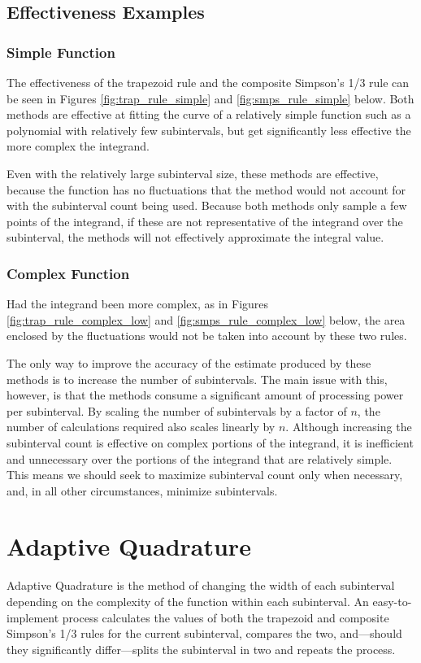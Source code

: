 \documentclass{paper}
\begin{document}
\subsection{Effectiveness Examples}
\subsubsection{Simple Function}

The effectiveness of the trapezoid rule and the composite Simpson's 1/3 rule can be seen in Figures \ref{fig:trap_rule_simple} and \ref{fig:smps_rule_simple} below.
Both methods are effective at fitting the curve of a relatively simple function such as a polynomial with relatively few subintervals, but get significantly less effective the more complex the integrand.




Even with the relatively large subinterval size, these methods are effective, because the function has no fluctuations that the method would not account for with the subinterval count being used.
Because both methods only sample a few points of the integrand, if these are not representative of the integrand over the subinterval, the methods will not effectively approximate the integral value.

\subsubsection{Complex Function}
Had the integrand been more complex, as in Figures \ref{fig:trap_rule_complex_low} and \ref{fig:smps_rule_complex_low} below, the area enclosed by the fluctuations would not be taken into account by these two rules.




The only way to improve the accuracy of the estimate produced by these methods is to increase the number of subintervals.
The main issue with this, however, is that the methods consume a significant amount of processing power per subinterval.
By scaling the number of subintervals by a factor of \(n\), the number of calculations required also scales linearly by \(n\).
Although increasing the subinterval count is effective on complex portions of the integrand, it is inefficient and unnecessary over the portions of the integrand that are relatively simple.
This means we should seek to maximize subinterval count only when necessary, and, in all other circumstances, minimize subintervals.

\section{Adaptive Quadrature}
Adaptive Quadrature is the method of changing the width of each subinterval depending on the complexity of the function within each subinterval.
An easy-to-implement process calculates the values of both the trapezoid and composite Simpson's 1/3 rules for the current subinterval, compares the two, and---should they significantly differ---splits the subinterval in two and repeats the process.%
\end{document}
